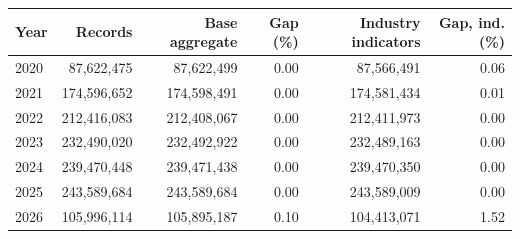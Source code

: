 \begin{tabular}{lrrrrr}
\toprule
Year & Records & Base aggregate & Gap (\%) & Industry indicators & Gap, ind. (\%) \\
\midrule
2020 & 87,622,475 & 87,622,499 & 0.00 & 87,566,491 & 0.06 \\
2021 & 174,596,652 & 174,598,491 & 0.00 & 174,581,434 & 0.01 \\
2022 & 212,416,083 & 212,408,067 & 0.00 & 212,411,973 & 0.00 \\
2023 & 232,490,020 & 232,492,922 & 0.00 & 232,489,163 & 0.00 \\
2024 & 239,470,448 & 239,471,438 & 0.00 & 239,470,350 & 0.00 \\
2025 & 243,589,684 & 243,589,684 & 0.00 & 243,589,009 & 0.00 \\
2026 & 105,996,114 & 105,895,187 & 0.10 & 104,413,071 & 1.52 \\
\bottomrule
\end{tabular}
